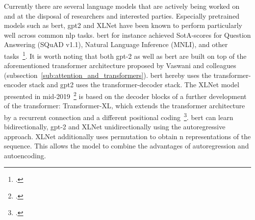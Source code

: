 Currently there are several language models that are actively being worked on and at the disposal of researchers and interested parties. Especially pretrained models such as \gls{bert}, \gls{gpt2} and XLNet have been known to perform particularly well across common \gls{nlp} tasks. \gls{bert} for instance achieved SotA-scores for Question Answering (SQuAD v1.1), Natural Language Inference (MNLI), and other tasks~\footcite{DBLP:journals/corr/abs-1810-04805}. It is worth noting that both \gls{gpt}-2 as well as \gls{bert} are built on top of the aforementioned transformer architecture proposed by Vaswani and colleagues (subsection~\ref{sub:attention_and_transformers}). \gls{bert} hereby uses the transformer-encoder stack and \gls{gpt2} uses the transformer-decoder stack. The XLNet model presented in mid-2019~\footcite{DBLP:journals/corr/abs-1906-08237} is based on the decoder blocks of a further development of the transformer: Transformer-XL, which extends the transformer architecture by a recurrent connection and a different positional coding~\footcite{DBLP:journals/corr/abs-1901-02860}. \gls{bert} can learn bidirectionally, \gls{gpt}-2 and XLNet unidirectionally using the autoregressive approach. XLNet additionally uses permutation to obtain n representations of the sequence. This allows the model to combine the advantages of autoregression and autoencoding.


